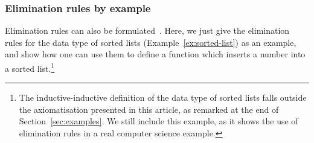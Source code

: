 \documentclass{article}
\begin{document}
\subsubsection{Elimination rules by example}
\label{sec:elim}

Elimination rules can also be
formulated~\cite{nordvallforsbergAltenkirchMorrisSetzer2011catsemindind}. Here,
we just give the elimination rules for the data type of sorted lists
(Example~\ref{ex:sorted-list}) as an example, and show how one can use
them to define a function which inserts a number into a sorted
list.\footnote{The inductive-inductive definition of the data type of
  sorted lists falls outside the axiomatisation presented in this
  article, as remarked at the end of Section~\ref{sec:examples}. We
  still include this example, as it shows the use of elimination rules
  in a real computer science example.}
\end{document}
